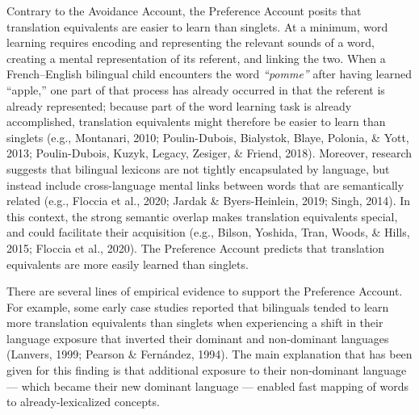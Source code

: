 \documentclass[
  english,
  ,man,floatsintext]{apa6}
\begin{document}
Contrary to the Avoidance Account, the Preference Account posits that translation equivalents are easier to learn than singlets. At a minimum, word learning requires encoding and representing the relevant sounds of a word, creating a mental representation of its referent, and linking the two. When a French--English bilingual child encounters the word \emph{``pomme''} after having learned ``apple,'' one part of that process has already occurred in that the referent is already represented; because part of the word learning task is already accomplished, translation equivalents might therefore be easier to learn than singlets (e.g., Montanari, 2010; Poulin-Dubois, Bialystok, Blaye, Polonia, \& Yott, 2013; Poulin-Dubois, Kuzyk, Legacy, Zesiger, \& Friend, 2018). Moreover, research suggests that bilingual lexicons are not tightly encapsulated by language, but instead include cross-language mental links between words that are semantically related (e.g., Floccia et al., 2020; Jardak \& Byers-Heinlein, 2019; Singh, 2014). In this context, the strong semantic overlap makes translation equivalents special, and could facilitate their acquisition (e.g., Bilson, Yoshida, Tran, Woods, \& Hills, 2015; Floccia et al., 2020). The Preference Account predicts that translation equivalents are more easily learned than singlets.

There are several lines of empirical evidence to support the Preference Account. For example, some early case studies reported that bilinguals tended to learn more translation equivalents than singlets when experiencing a shift in their language exposure that inverted their dominant and non-dominant languages (Lanvers, 1999; Pearson \& Fernández, 1994). The main explanation that has been given for this finding is that additional exposure to their non-dominant language --- which became their new dominant language --- enabled fast mapping of words to already-lexicalized concepts.
\end{document}
